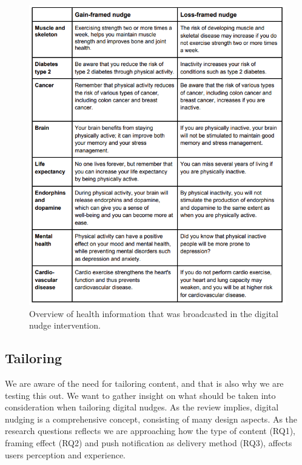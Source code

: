 \begin{figure}
    \includegraphics[width=1\textwidth]{images/Nudger.png}
    \caption{Overview of health information that was broadcasted in the digital nudge intervention.}\label{fig:my_label} 
\end{figure}

\subsection{Tailoring}
We are aware of the need for tailoring content, and that is also why we are testing this out. We want to gather insight on what should be taken into consideration when tailoring digital nudges. As the review implies, digital nudging is a comprehensive concept, consisting of many design aspects. As the research questions reflects we are approaching how the type of content (RQ1), framing effect (RQ2) and push notification as delivery method (RQ3), affects users perception and experience. 


